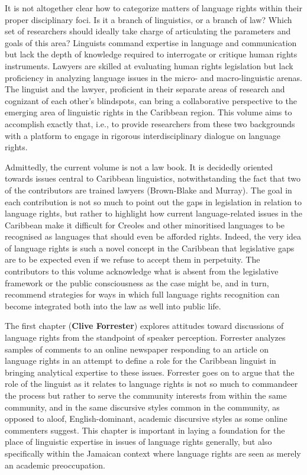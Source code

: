 
It is not altogether clear how to categorize matters of language rights within their proper disciplinary foci. Is it a branch of linguistics, or a branch of law? Which set of researchers should ideally take charge of articulating the parameters and goals of this area? Linguists command expertise in language and communication but lack the depth of knowledge required to interrogate or critique human rights instruments. Lawyers are skilled at evaluating human rights legislation but lack proficiency in analyzing language issues in the micro- and macro-linguistic arenas. The linguist and the lawyer, proficient in their separate areas of research and cognizant of each other’s blindspots, can bring a collaborative perspective to the emerging area of linguistic rights in the Caribbean region. This volume aims to accomplish exactly that, i.e., to provide researchers from these two backgrounds with a platform to engage in rigorous interdisciplinary dialogue on language rights. 

Admittedly, the current volume is not a law book. It is decidedly oriented towards issues central to Caribbean linguistics, notwithstanding the fact that two of the contributors are trained lawyers (Brown-Blake and Murray). The goal in each contribution is not so much to point out the gaps in legislation in relation to language rights, but rather to highlight how current language-related issues in the Caribbean make it difficult for Creoles and other minoritised languages to be recognised as languages that should even be afforded rights. Indeed, the very idea of language rights is such a novel concept in the Caribbean that legislative gaps are to be expected even if we refuse to accept them in perpetuity. The contributors to this volume acknowledge what is absent from the legislative framework or the public consciousness as the case might be, and in turn, recommend strategies for ways in which full language rights recognition can become integrated both into the law as well into public life. 

The first chapter (\textbf{Clive Forrester}) explores attitudes toward discussions of language rights from the standpoint of speaker perception. Forrester analyzes samples of comments to an online newspaper responding to an article on language rights in an attempt to define a role for the Caribbean linguist in bringing analytical expertise to these issues. Forrester goes on to argue that the role of the linguist as it relates to language rights is not so much to commandeer the process but rather to serve the community interests from within the same community, and in the same discursive styles common in the community, as opposed to aloof, English-dominant, academic discursive styles as some online commenters suggest. This chapter is important in laying a foundation for the place of linguistic expertise in issues of language rights generally, but also specifically within the Jamaican context where language rights are seen as merely an academic preoccupation. 


